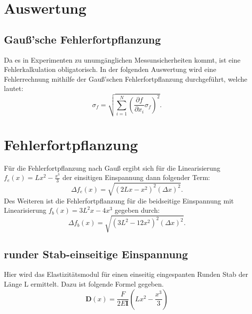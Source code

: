 \section{Auswertung}
\label{sec:Auswertung}

\subsection{Gauß'sche Fehlerfortpflanzung}
Da es in Experimenten zu unumgänglichen Messunsicherheiten kommt, ist eine 
Fehlerkalkulation obligatorisch. In der folgenden Auswertung wird eine 
Fehlerrechnung mithilfe der Gauß'schen Fehlerfortpflanzung durchgeführt, welche
lautet:
\begin{equation}
    \sigma_f = \sqrt{\sum\limits_{i=1}^N \left( \frac{\partial f}{\partial x_i} \sigma_f \right) ^2}.
\end{equation}

\section{Fehlerfortpflanzung}
Für die Fehlerfortpflanzung nach Gauß ergibt sich für die Linearisierung
$f_e(x)=Lx^2-\frac{x^3}{3}$ der einsitigen Einspannung dann folgender Term:
\begin{equation}
  \Delta f_e(x) = \sqrt{(2Lx-x^2)^2 (\Delta x)^2}.
\end{equation}
Des Weiteren ist die Fehlerfortpflanzung für die beidseitige Einspannung 
mit Linearisierung $f_b(x)=3L^2x-4x^3$ gegeben durch:
\begin{equation}
  \Delta f_b(x) = \sqrt{(3L^2-12x^2)^2 (\Delta x)^2}.
\end{equation}


\subsection{runder Stab-einseitige Einspannung}
\label{sec:RunderStabEinseitig}
Hier wird das Elastizitätsmodul für einen einseitig eingespanten Runden Stab der Länge
L ermittelt. Dazu ist folgende Formel gegeben.
\begin{equation}
  \label{eqn:dEinseitigeEinspannung}
    \symbf{D}(x) = \frac{F}{2 E \symbf{I}}\left(L x^2 - \frac{x^3}{3}\right)
\end{equation}

